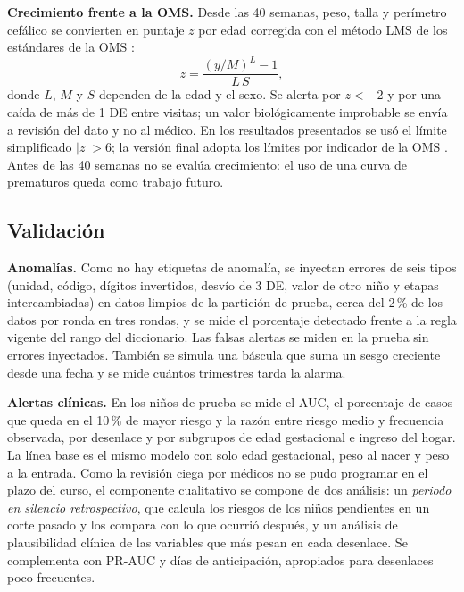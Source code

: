 \textbf{Crecimiento frente a la OMS.} Desde las 40 semanas, peso, talla y perímetro cefálico se convierten en puntaje $z$ por edad corregida con el método LMS de los estándares de la OMS \cite{oms2006}:
\begin{equation}
z = \frac{(y/M)^{L} - 1}{L\,S},
\label{eq:lms}
\end{equation}
donde $L$, $M$ y $S$ dependen de la edad y el sexo. Se alerta por $z < -2$ y por una caída de más de 1 DE entre visitas; un valor biológicamente improbable se envía a revisión del dato y no al médico. En los resultados presentados se usó el límite simplificado $|z| > 6$; la versión final adopta los límites por indicador de la OMS \cite{omsunicef2019} . Antes de las 40 semanas no se evalúa crecimiento: el uso de una curva de prematuros \cite{fenton2013,villar2015} queda como trabajo futuro.

\subsection{Validación}
\label{sec:validacion}
\textbf{Anomalías.} Como no hay etiquetas de anomalía, se inyectan errores de seis tipos (unidad, código, dígitos invertidos, desvío de 3 DE, valor de otro niño y etapas intercambiadas) en datos limpios de la partición de prueba, cerca del 2\,\% de los datos por ronda en tres rondas, y se mide el porcentaje detectado frente a la regla vigente del rango del diccionario. Las falsas alertas se miden en la prueba sin errores inyectados. También se simula una báscula que suma un sesgo creciente desde una fecha y se mide cuántos trimestres tarda la alarma.

\textbf{Alertas clínicas.} En los niños de prueba se mide el AUC, el porcentaje de casos que queda en el 10\,\% de mayor riesgo y la razón entre riesgo medio y frecuencia observada, por desenlace y por subgrupos de edad gestacional e ingreso del hogar. La línea base es el mismo modelo con solo edad gestacional, peso al nacer y peso a la entrada. Como la revisión ciega por médicos no se pudo programar en el plazo del curso, el componente cualitativo se compone de dos análisis: un \emph{periodo en silencio retrospectivo}, que calcula los riesgos de los niños pendientes en un corte pasado y los compara con lo que ocurrió después, y un análisis de plausibilidad clínica de las variables que más pesan en cada desenlace. Se complementa con PR-AUC y días de anticipación, apropiados para desenlaces poco frecuentes.

